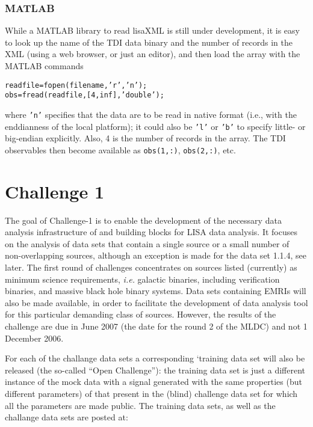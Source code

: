 \documentclass[11pt]{report}
\begin{document}
\subsection{MATLAB}

While a MATLAB library to read lisaXML is still under development, it is easy to look up the name of the TDI data binary and the number of records in the XML (using a web browser, or just an editor), and then load the array with the MATLAB commands
%
\begin{alltt}
readfile = fopen(filename,'r','n');
obs = fread(readfile,[4,inf],'double');

\end{alltt}
%
where \texttt{'n'} specifies that the data are to be read in native format (i.e., with the enddianness of the local platform); it could also be \texttt{'l'} or \texttt{'b'} to specify little- or big-endian explicitly. Also, 4 is the number of records in the array. The TDI observables then become available as \texttt{obs(1,:)}, \texttt{obs(2,:)}, etc.


\chapter{Challenge 1}

The goal of Challenge-1 is to enable the development of the necessary data analysis infrastructure of and building blocks for LISA data analysis. It focuses on the analysis of data sets that contain a single source or a small number of non-overlapping sources, although an exception is made for the data set 1.1.4, see later. The first round of challenges concentrates on sources listed (currently) as minimum science requirements, {\em i.e.} galactic binaries, including verification binaries, and massive black hole binary systems. Data sets containing EMRIs will also be made available, in order to facilitate the development of data analysis tool for this particular demanding class of sources. However, the results of the challenge are due in June 2007 (the date for the round 2 of the MLDC) and not 1 December 2006.

For each of the challange data sets a corresponding `training data set will also be released (the so-called ``Open Challenge''): the training data set is just a different instance of the mock data with a signal generated with the same properties (but different parameters) of that present in the (blind) challenge data set for which all the parameters are made public. The training data sets, as well as the challange data sets are posted at:
\end{document}
